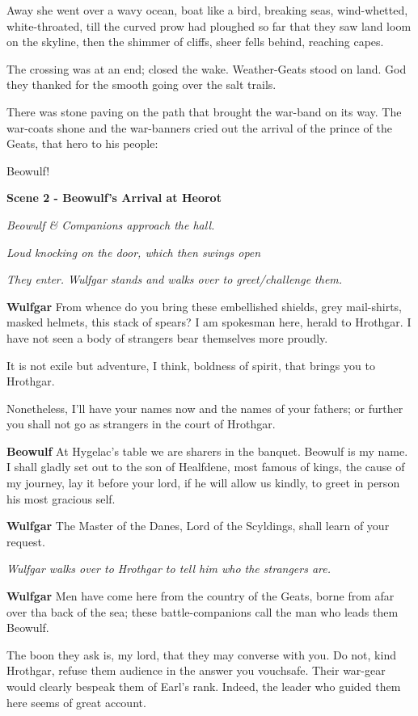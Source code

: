 \documentclass[a4paper]{article}
\begin{document}
{Away she went over a wavy ocean,
boat like a bird, breaking seas,
wind-whetted, white-throated,
till the curved prow had ploughed so far
that they saw land loom on the skyline,
then the shimmer of cliffs, sheer fells behind,
reaching capes.

The crossing was at an end;
closed the wake. Weather-Geats
stood on land. God they thanked
for the smooth going over the salt trails.

There was stone paving on the path that brought
the war-band on its way. The war-coats shone
and the war-banners cried out the arrival of the prince 
of the Geats, that hero to his people:

Beowulf!

\centerline{\textbf{Scene 2 - Beowulf's Arrival at Heorot}}
\centerline{\textit{Beowulf \& Companions approach the hall.}}
\centerline{\textit{Loud knocking on the door, which then swings open}}
\centerline{\textit{They enter. Wulfgar stands and walks over to greet/challenge them.}}

\textbf{Wulfgar} From whence do you bring these embellished shields, 
grey mail-shirts, masked helmets, 
this stack of spears? I am spokesman here,
herald to Hrothgar. I have not seen
a body of strangers bear themselves more proudly.

It is not exile but adventure, I think,
boldness of spirit, that brings you to Hrothgar.

Nonetheless, I’ll have your names now
and the names of your fathers; or further you shall not go
as strangers in the court of Hrothgar.

\textbf{Beowulf} At Hygelac's table we are sharers in the banquet.
Beowulf is my name.
I shall gladly set out to the son of Healfdene,
most famous of kings, the cause of my journey,
lay it before your lord, if he will allow us kindly,
to greet in person his most gracious self.

\textbf{Wulfgar} The Master of the Danes,
Lord of the Scyldings, shall learn of your request.

\centerline{\textit{Wulfgar walks over to Hrothgar to tell him who the strangers are.}}

\textbf{Wulfgar} Men have come here from the country of the Geats,
borne from afar over tha back of the sea;
these battle-companions call the man who leads them Beowulf.

The boon they ask is, my lord, that they may converse with you. 
Do not, kind Hrothgar, refuse them audience in the answer you vouchsafe.
Their war-gear would clearly bespeak them of Earl's rank. 
Indeed, the leader who guided them here seems of great account.

}
\end{document}
